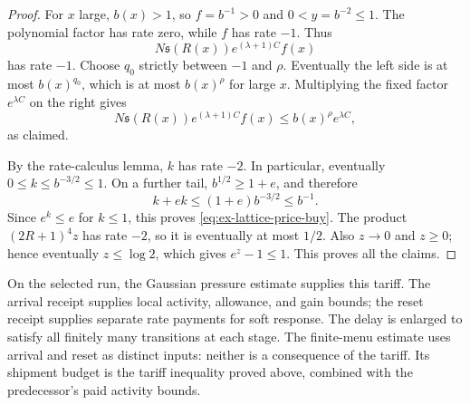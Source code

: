 \begin{proof}
For $x$ large, $b(x)>1$, so $f=b^{-1}>0$ and $0<y=b^{-2}\leq1$.
The polynomial factor has rate zero, while $f$ has rate $-1$. Thus
\[
 N\mathfrak s(R(x))e^{(\lambda+1)C}f(x)
\]
has rate $-1$. Choose $q_0$ strictly between $-1$ and $\rho$. Eventually
the left side is at most $b(x)^{q_0}$, which is at most $b(x)^\rho$ for
large $x$. Multiplying the fixed factor $e^{\lambda C}$ on the right gives
\[
 N\mathfrak s(R(x))e^{(\lambda+1)C}f(x)
 \leq b(x)^\rho e^{\lambda C},
\]
as claimed.

By the rate-calculus lemma, $k$ has rate $-2$. In particular, eventually
$0\leq k\leq b^{-3/2}\leq1$. On a further tail,
$b^{1/2}\geq1+e$, and therefore
\[
 k+e k\leq(1+e)b^{-3/2}\leq b^{-1}.
\]
Since $e^k\leq e$ for $k\leq1$,
this proves \eqref{eq:ex-lattice-price-buy}. The product
$(2R+1)^4z$ has rate $-2$, so it is eventually at most $1/2$. Also
$z\to0$ and $z\geq0$; hence eventually $z\leq\log2$, which gives
$e^z-1\leq1$. This proves all the claims.
\end{proof}

\begin{remark}
\label{rem:ex-lattice-price-receipt-placement}
On the selected run, the Gaussian pressure estimate supplies this tariff.
The arrival receipt supplies local activity, allowance, and gain bounds; the
reset receipt supplies separate rate payments for soft response. The delay
is enlarged to satisfy all finitely many transitions at each stage. The
finite-menu estimate uses arrival and reset as distinct inputs: neither is a
consequence of the tariff. Its shipment budget is the tariff inequality
proved above, combined with the predecessor's paid activity bounds.
\end{remark}
